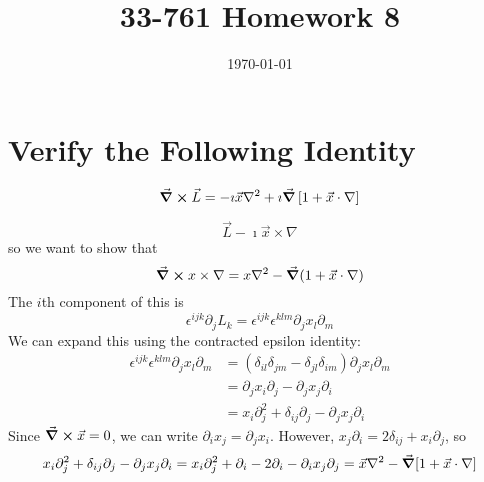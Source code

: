 \documentclass[a4paper,twoside]{article}
\title{33-761 Homework 8}
\date{\today}
\begin{document}
\maketitle
\section{Verify the Following Identity}
\begin{equation}
    \curl{ \vec{L}} = - \imath \vec{x} \laplacian + \imath \grad{\left[ 1 + \vec{x} \cdot \nabla \right]}
\end{equation}
\begin{problem}
    \begin{equation}
        \vec{L} -\imath \vec{x} \times \nabla
    \end{equation}
    so we want to show that
    \begin{equation}
        \curl{ x \times \nabla } = x \laplacian - \grad{(1 + \vec{x} \cdot \nabla)}
    \end{equation}
    The $ i $th component of this is
    \begin{equation}
        \epsilon^{ijk}\partial_j L_k = \epsilon^{ijk}\epsilon^{klm}\partial_j x_l \partial_m
    \end{equation}
    We can expand this using the contracted epsilon identity:
    \begin{align}
        \epsilon^{ijk}\epsilon^{klm}\partial_j x_l \partial_m &= (\delta_{il} \delta_{jm} - \delta_{jl} \delta_{im})\partial_j x_l \partial_m\\
        &= \partial_j x_i \partial_j - \partial_j x_j \partial_i\\
        &= x_i \partial_j^2 + \delta_{ij} \partial_j - \partial_j x_j \partial_i
    \end{align}
    Since $ \curl{ \vec{x}} = 0 $, we can write $ \partial_i x_j = \partial_j x_i $. However, $ x_j\partial_i = 2\delta_{ij} + x_i\partial_j $, so
    \begin{equation}
        x_i \partial_j^2 + \delta_{ij} \partial_j - \partial_j x_j \partial_i = x_i\partial_j^2 + \partial_i - 2\partial_i - \partial_i x_j \partial_j = \vec{x} \laplacian - \grad{[1 + \vec{x} \cdot \nabla]}
    \end{equation}
\end{problem}
\end{document}
